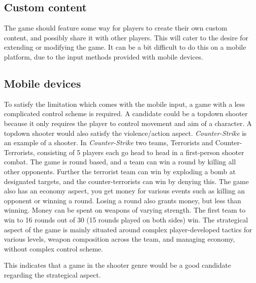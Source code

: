 \subsection{Custom content}\label{sec:selectionofgametype:customcontent}
The game should feature some way for players to create their own custom content, and possibly share it with other players.
This will cater to the desire for extending or modifying the game.
It can be a bit difficult to do this on a mobile platform, due to the input methods provided with mobile devices.

\subsection{Mobile devices}\label{sec:selectionofgametype:mobiledevices}
To satisfy the limitation which comes with the mobile input, a game with a less complicated control scheme is required.
A candidate could be a topdown shooter because it only requires the player to control movement and aim of a character. A topdown shooter would also satisfy the violence/action aspect.
\textit{Counter-Strike} is an example of a shooter. \cite{counterstrike}
In \textit{Counter-Strike} two teams, Terrorists and Counter-Terrorists, consisting of 5 players each go head to head in a first-person shooter combat. 
The game is round based, and a team can win a round by killing all other opponents. 
Further the terrorist team can win by exploding a bomb at designated targets, and the counter-terrorists can win by denying this. 
The game also has an economy aspect, you get money for various events such as killing an opponent or winning a round.
Losing a round also grants money, but less than winning.
Money can be spent on weapons of varying strength.
The first team to win to 16 rounds out of 30 (15 rounds played on both sides) win. 
The strategical aspect of the game is mainly situated around complex player-developed tactics for various levels, weapon composition across the team, and managing economy, without complex control scheme.

This indicates that a game in the shooter genre would be a good candidate regarding the strategical aspect.

